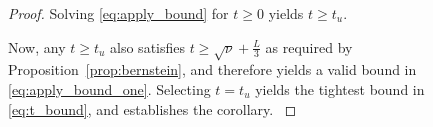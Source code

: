 \begin{proof}
{
Solving \eqref{eq:apply_bound} for $t\geq 0$ yields $t\geq t_u$.
%

}
Now, any $t\geq t_u$
also satisfies $t\geq \sqrt{\nu}+\frac{L}{3}$ as required by Proposition~\ref{prop:bernstein}, and therefore yields a valid bound in \eqref{eq:apply_bound_one}.
%      
{Selecting $t=t_u$ yields 
 the tightest bound in \eqref{eq:t_bound}, and establishes the corollary. 
}
\end{proof}


